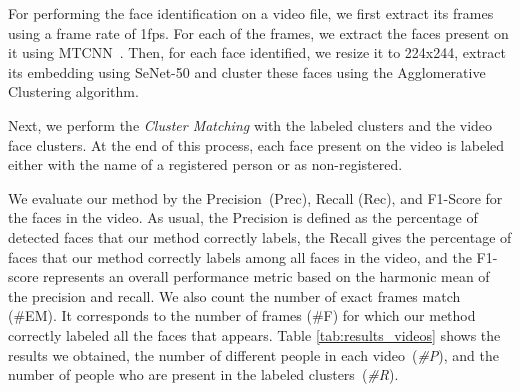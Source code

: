 For performing the face identification on a video file, we first extract its frames using a frame rate of 1fps.
For each of the frames, we extract the faces present on it using MTCNN~\cite{mtcnn}. 
Then, for each face identified, we resize it to 224x244, extract its embedding using SeNet-50 and cluster these faces using the Agglomerative Clustering algorithm.

Next, we perform the \emph{Cluster Matching} with the labeled clusters and the video face clusters.
At the end of this process, each face present on the video is labeled either with the name of a registered person or as non-registered.

We evaluate our method by the Precision~(Prec), Recall (Rec), and F1-Score for the faces in the video. 
As usual, the Precision is defined as the percentage of detected faces that our method correctly labels, 
the Recall gives the percentage of faces that our method correctly labels among all faces in the video, and 
the F1-score represents an overall performance metric based on the  harmonic mean of the precision and recall.
We also count the number of exact frames match (\#EM). It corresponds to the number of frames (\#F) for which our method correctly labeled all the faces that appears. 
Table \ref{tab:results_videos} shows the results we obtained, the number of different people in each video~(\emph{\#P}), and the number of people who are present in the labeled clusters~(\emph{\#R}).

